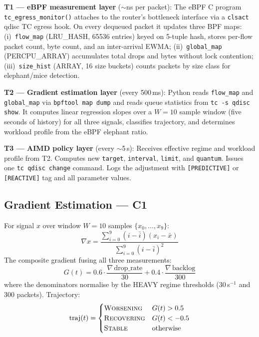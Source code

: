 \documentclass[conference]{IEEEtran}
\begin{document}
\textbf{T1 --- eBPF measurement layer} ($\sim$ns per packet): The eBPF C
program \texttt{tc\_egress\_monitor()} attaches to the router's bottleneck
interface via a \texttt{clsact} qdisc TC egress hook. On every dequeued packet
it updates three BPF maps: (i)~\texttt{flow\_map} (LRU\_HASH, 65536 entries)
keyed on 5-tuple hash, stores per-flow packet count, byte count, and an
inter-arrival EWMA; (ii)~\texttt{global\_map} (PERCPU\_ARRAY) accumulates total
drops and bytes without lock contention; (iii)~\texttt{size\_hist} (ARRAY, 16
size buckets) counts packets by size class for elephant/mice detection.

\textbf{T2 --- Gradient estimation layer} (every 500\,ms): Python reads
\texttt{flow\_map} and \texttt{global\_map} via \texttt{bpftool map dump}
and reads queue statistics from \texttt{tc -s qdisc show}. It computes linear
regression slopes over a $W=10$ sample window (five seconds of history) for
all three signals, classifies trajectory, and determines workload profile from
the eBPF elephant ratio.

\textbf{T3 --- AIMD policy layer} (every $\sim$5\,s): Receives effective regime
and workload profile from T2. Computes new \texttt{target}, \texttt{interval},
\texttt{limit}, and \texttt{quantum}. Issues one \texttt{tc qdisc change}
command. Logs the adjustment with \texttt{[PREDICTIVE]} or \texttt{[REACTIVE]}
tag and all parameter values.

\subsection{Gradient Estimation --- C1}

For signal $x$ over window $W=10$ samples $\{x_0, \ldots, x_9\}$:
\begin{equation}
\nabla x = \frac{\sum_{i=0}^{9}(i - \bar{i})(x_i - \bar{x})}
                {\sum_{i=0}^{9}(i - \bar{i})^2}
\label{eq:gradient}
\end{equation}
The composite gradient fusing all three measurements:
\begin{equation}
G(t) = 0.6 \cdot \frac{\nabla\,\text{drop\_rate}}{30}
     + 0.4 \cdot \frac{\nabla\,\text{backlog}}{300}
\label{eq:composite}
\end{equation}
where the denominators normalise by the HEAVY regime thresholds (30\,s$^{-1}$
and 300 packets). Trajectory:
\[
\text{traj}(t) = \begin{cases}
  \textsc{Worsening}  & G(t) > 0.5 \\
  \textsc{Recovering} & G(t) < -0.5 \\
  \textsc{Stable}     & \text{otherwise}
\end{cases}
\]
\end{document}
